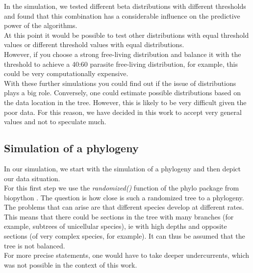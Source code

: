       In the simulation, we tested different beta distributions with different thresholds and found that 
        this combination has a considerable influence on the predictive power of the algorithms. \\
      At this point it would be possible to test other distributions with equal threshold values or 
        different threshold values with equal distributions. \\
      However, if you choose a strong free-living distribution and balance it with the threshold to 
        achieve a 40:60 parasite free-living distribution, for example, this could be very 
        computationally expensive. \\
      
      With these further simulations you could find out if the issue of distributions plays a big role. 
        Conversely, one could estimate possible distributions based on the data location in the tree. 
        However, this is likely to be very difficult given the poor data. For this reason, we have 
        decided in this work to accept very general values and not to speculate much. \\

    \subsection{Simulation of a phylogeny} \label{sec:discussion - simulate phylogeny}
      In our simulation, we start with the simulation of a phylogeny and then depict our data situation. \\
      For this first step we use the \textit{randomized()} function of the phylo package from biopython
        \cite{Cock2009}. The question is how close is such a randomized tree to a phylogeny. \\
      
      The problems that can arise are that different species develop at different rates. This means that 
        there could be sections in the tree with many branches (for example, subtrees of unicellular 
        species), ie with high depths and opposite sections (of very complex species, for example). It 
        can thus be assumed that the tree is not balanced. \\
      For more precise statements, one would have to take deeper undercurrents, which was not possible 
        in the context of this work.


